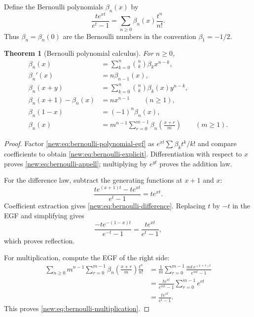 \documentclass[11pt,a4paper,oneside,openany]{book}
\newtheorem{theorem}{Theorem}[chapter]
\theoremstyle{definition}
\theoremstyle{remark}
\begin{document}
Define the Bernoulli polynomials $\beta_n(x)$ by
\begin{equation}
 \frac{t e^{xt}}{e^t-1}
 =\sum_{n\ge0}\beta_n(x)\frac{t^n}{n!}.
 \label{new:eq:bernoulli-polynomial-egf}
\end{equation}
Thus $\beta_n=\beta_n(0)$ are the Bernoulli numbers in the convention
$\beta_1=-1/2$.

\begin{theorem}[Bernoulli polynomial calculus]
For $n\ge0$,
\begin{align}
 \beta_n(x)&=\sum_{k=0}^n\binom nk\beta_k x^{n-k},
 \label{new:eq:bernoulli-explicit}\\
 \beta_n'(x)&=n\beta_{n-1}(x),
 \label{new:eq:bernoulli-appell}\\
 \beta_n(x+y)&=\sum_{k=0}^n\binom nk\beta_k(x)y^{n-k},
 \label{new:eq:bernoulli-addition}\\
 \beta_n(x+1)-\beta_n(x)&=n x^{n-1}\qquad(n\ge1),
 \label{new:eq:bernoulli-difference}\\
 \beta_n(1-x)&=(-1)^n\beta_n(x),
 \label{new:eq:bernoulli-reflection}\\
 \beta_n(x)&=m^{n-1}\sum_{r=0}^{m-1}
 \beta_n\!\left(\frac{x+r}{m}\right)\qquad(m\ge1).
 \label{new:eq:bernoulli-multiplication}
\end{align}
\end{theorem}

\begin{proof}
Factor \eqref{new:eq:bernoulli-polynomial-egf} as
$e^{xt}\sum\beta_kt^k/k!$ and compare coefficients to obtain
\eqref{new:eq:bernoulli-explicit}.  Differentiation with respect to $x$ proves
\eqref{new:eq:bernoulli-appell}; multiplying by $e^{yt}$ proves the addition
law.

For the difference law, subtract the generating functions at $x+1$ and $x$:
\[
 \frac{te^{(x+1)t}-te^{xt}}{e^t-1}=te^{xt}.
\]
Coefficient extraction gives \eqref{new:eq:bernoulli-difference}.  Replacing
$t$ by $-t$ in the EGF and simplifying gives
\[
 \frac{-te^{-(1-x)t}}{e^{-t}-1}
 =\frac{te^{xt}}{e^t-1},
\]
which proves reflection.

For multiplication, compute the EGF of the right side:
\begin{align*}
 \sum_{n\ge0}m^{n-1}\sum_{r=0}^{m-1}
 \beta_n\!\left(\frac{x+r}{m}\right)\frac{t^n}{n!}
 &=\frac1m\sum_{r=0}^{m-1}
   \frac{mt\,e^{(x+r)t}}{e^{mt}-1}\\
 &=\frac{te^{xt}}{e^{mt}-1}\sum_{r=0}^{m-1}e^{rt}\\
 &=\frac{te^{xt}}{e^t-1}.
\end{align*}
This proves \eqref{new:eq:bernoulli-multiplication}.
\end{proof}
\end{document}
